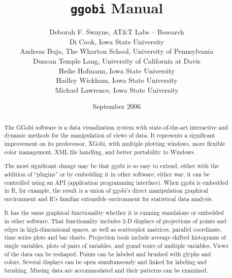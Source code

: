 \documentclass[11pt]{article}
\begin{document}
\title {{\tt ggobi} Manual}
\author{
Deborah F. Swayne, AT\&T Labs -- Research \\
Di Cook, Iowa State University \\
Andreas Buja, The Wharton School, University of Pennsylvania \\
Duncan Temple Lang, University of California at Davis \\
Heike Hofmann,  Iowa State University \\
Hadley Wickham, Iowa State University \\
Michael Lawrence, Iowa State University 
}

\date{September 2006}

\maketitle

\begin{abstract}

The GGobi software is a data visualization system with state-of-the-art
interactive and dynamic methods for the manipulation of views of
data.  It represents a significant improvement on its predecessor, XGobi,
with multiple plotting windows, more flexible color management, XML file
handling, and better portability to Windows.

The most significant change may be that ggobi is so easy to extend, either
with the addition of ``plugins'' or by embedding it in other software;
either way, it can be controlled using an API (application programming
interface).  When ggobi is embedded in R, for example, the result is a
union of ggobi's direct manipulation graphical environment
and R's familiar extensible environment for statistical data analysis.

It has the same graphical functionality whether it is running
standalone or embedded in other software.  That functionality includes
2-D displays of projections of points and edges in high-dimensional
spaces, as well as scatterplot matrices, parallel coordinate, time
series plots and bar charts.  Projection tools include average shifted
histograms of single variables, plots of pairs of variables, and grand
tours of multiple variables.  Views of the data can be reshaped.
Points can be labeled and brushed with glyphs and colors.  Several
displays can be open simultaneously and linked for labeling and
brushing.  Missing data are accommodated and their patterns can be
examined.
\end{abstract}
\end{document}

